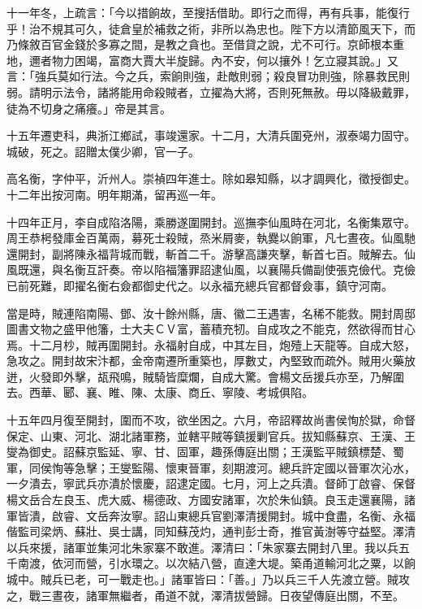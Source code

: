 \begin{pinyinscope}
十一年冬，上疏言：「今以措餉故，至搜括借助。即行之而得，再有兵事，能復行乎！治不規其可久，徒倉皇於補救之術，非所以為忠也。陛下方以清節風天下，而乃條敘百官金錢於多寡之間，是教之貪也。至借貸之說，尤不可行。京師根本重地，邇者物力困竭，富商大賈大半旋歸。內不安，何以攘外！乞立寢其說。」又言：「強兵莫如行法。今之兵，索餉則強，赴敵則弱；殺良冒功則強，除暴救民則弱。請明示法令，諸將能用命殺賊者，立擢為大將，否則死無赦。毋以降級戴罪，徒為不切身之痛癢。」帝是其言。

十五年遷吏科，典浙江鄉試，事竣還家。十二月，大清兵圍兗州，淑泰竭力固守。城破，死之。詔贈太僕少卿，官一子。

高名衡，字仲平，沂州人。崇禎四年進士。除如皋知縣，以才調興化，徵授御史。十二年出按河南。明年期滿，留再巡一年。

十四年正月，李自成陷洛陽，乘勝遂圍開封。巡撫李仙風時在河北，名衡集眾守。周王恭枵發庫金百萬兩，募死士殺賊，烝米屑麥，執爨以餉軍，凡七晝夜。仙風馳還開封，副將陳永福背城而戰，斬首二千。游擊高謙夾擊，斬首七百。賊解去。仙風既還，與名衡互訐奏。帝以陷福籓罪詔逮仙風，以襄陽兵備副使張克儉代。克儉已前死難，即擢名衡右僉都御史代之。以永福充總兵官都督僉事，鎮守河南。

當是時，賊連陷南陽、鄧、汝十餘州縣，唐、徽二王遇害，名稀不能救。開封周邸圖書文物之盛甲他籓，士大夫ＣＶ富，蓄積充牣。自成攻之不能克，然欲得而甘心焉。十二月杪，賊再圍開封。永福射自成，中其左目，炮殪上天龍等。自成大怒，急攻之。開封故宋汴都，金帝南遷所重築也，厚數丈，內堅致而疏外。賊用火藥放迸，火發即外擊，瓳飛鳴，賊騎皆糜爛，自成大驚。會楊文岳援兵亦至，乃解圍去。西華、郾、襄、睢、陳、太康、商丘、寧陵、考城俱陷。

十五年四月復至開封，圍而不攻，欲坐困之。六月，帝詔釋故尚書侯恂於獄，命督保定、山東、河北、湖北諸軍務，並轄平賊等鎮援剿官兵。拔知縣蘇京、王漢、王燮為御史。詔蘇京監延、寧、甘、固軍，趣孫傳庭出關；王漢監平賊鎮標楚、蜀軍，同侯恂等急擊；王燮監陽、懷東晉軍，刻期渡河。總兵許定國以晉軍次沁水，一夕潰去，寧武兵亦潰於懷慶，詔逮定國。七月，河上之兵潰。督師丁啟睿、保督楊文岳合左良玉、虎大威、楊德政、方國安諸軍，次於朱仙鎮。良玉走還襄陽，諸軍皆潰，啟睿、文岳奔汝寧。詔山東總兵官劉澤清援開封。城中食盡，名衡、永福偕監司梁炳、蘇壯、吳士講，同知蘇茂灼，通判彭士奇，推官黃澍等守益堅。澤清以兵來援，諸軍並集河北朱家寨不敢進。澤清曰：「朱家寨去開封八里。我以兵五千南渡，依河而營，引水環之。以次結八營，直達大堤。築甬道輸河北之粟，以餉城中。賊兵已老，可一戰走也。」諸軍皆曰：「善。」乃以兵三千人先渡立營。賊攻之，戰三晝夜，諸軍無繼者，甬道不就，澤清拔營歸。日夜望傳庭出關，不至。


\end{pinyinscope}
